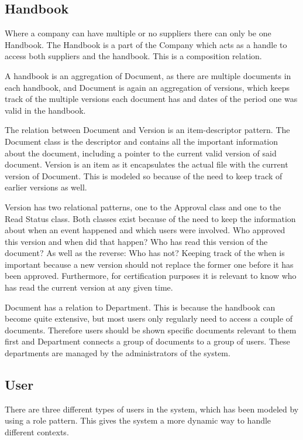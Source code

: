 \subsection{Handbook}\label{sec:classdiagramhandbook}
Where a company can have multiple or no suppliers there can only be one Handbook.
The Handbook is a part of the Company which acts as a handle to access both suppliers and the handbook. This is a composition relation.

A handbook is an aggregation of Document, as there are multiple documents in each handbook, and Document is again an aggregation of versions, which keeps track of the multiple versions each document has and dates of the period one was valid in the handbook.

The relation between Document and Version is an item-descriptor pattern.
The Document class is the descriptor and contains all the important information about the document, including a pointer to the current valid version of said document.
Version is an item as it encapsulates the actual file with the current version of Document.
This is modeled so because of the need to keep track of earlier versions as well.

Version has two relational patterns, one to the Approval class and one to the Read Status class.
Both classes exist because of the need to keep the information about when an event happened and which users were involved.
Who approved this version and when did that happen?
Who has read this version of the document?
As well as the reverse: Who has not?
Keeping track of the when is important because a new version should not replace the former one before it has been approved.
Furthermore, for certification purposes it is relevant to know who has read the current version at any given time.

Document has a relation to Department.
This is because the handbook can become quite extensive, but most users only regularly need to access a couple of documents.
Therefore users should be shown specific documents relevant to them first and Department connects a group of documents to a group of users.
These departments are managed by the administrators of the system.

\subsection{User}\label{sec:user}
There are three different types of users in the system, which has been modeled by using a role pattern. This gives the system a more dynamic way to handle different contexts.

